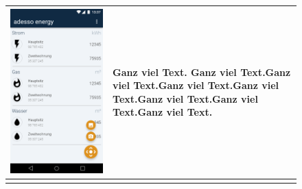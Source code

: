 \begin{figure}[h]
\begin{tabularx}{\textwidth}{X | X}
	\includegraphics[scale = 0.22]{img/AndroidMockup/FABMenu} & Ganz viel Text. Ganz viel Text.Ganz viel Text.Ganz viel Text.Ganz viel Text.Ganz viel Text.Ganz viel Text.Ganz viel Text. \\ \hline \\

\end{tabularx}
\end{figure}
